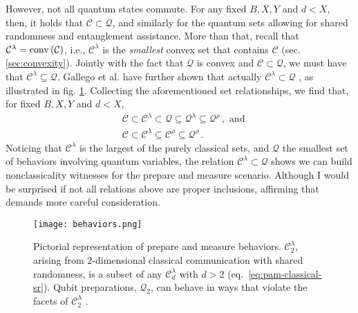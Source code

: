             However, not all quantum states commute. For any fixed $B,X,Y$ and $d < X$, then, it holds that $\mathcal{C} \subset \mathcal{Q}$, and similarly for the quantum sets allowing for shared randomness and entanglement assistance. More than that, recall that $\mathcal{C}^\lambda = \text{conv} \left( \mathcal{C} \right)$, i.e., $\mathcal{C}^\lambda$ is the \emph{smallest} convex set that contains $\mathcal{C}$ (sec. \ref{sec:convexity}). Jointly with the fact that $\mathcal{Q}$ is convex and $\mathcal{C} \subset \mathcal{Q}$, we must have that $\mathcal{C}^\lambda \subseteq \mathcal{Q}$. Gallego et al. have further shown that actually $\mathcal{C}^\lambda \subset \mathcal{Q}$ \cite{gallego_pam_2010}, as illustrated in fig. \ref{fig:pam-behaviors}. Collecting the aforementioned set relationships, we find that, for fixed $B, X, Y$ and $d < X$, 
			\begin{subequations}
            \begin{align}
                &\mathcal{C} \subset \mathcal{C}^\lambda \subset \mathcal{Q} \subseteq \mathcal{Q}^\lambda \subseteq \mathcal{Q}^\rho\, , \text{ and} \\
                &\mathcal{C} \subset \mathcal{C}^\lambda \subseteq \mathcal{C}^\rho \subseteq \mathcal{Q}^\rho\, .
            \end{align}
			\end{subequations}
            Noticing that $\mathcal{C}^\lambda$ is the largest of the purely classical sets, and $\mathcal{Q}$ the smallest set of behaviors involving quantum variables, the relation $\mathcal{C}^\lambda \subset \mathcal{Q}$ shows we can build nonclassicality witnesses for the prepare and measure scenario. Although I would be surprised if not all relations above are proper inclusions, affirming that demands more careful consideration.

			\begin{figure}
				\begin{minipage}[c]{0.43\textwidth}
					\centering
	                \texttt{[image: behaviors.png]}
			 	\end{minipage}
				\begin{minipage}[c]{0.55\textwidth}
					\caption{Pictorial representation of prepare and measure behaviors. $\mathcal{C}_2^\lambda$, arising from $2$-dimensional classical communication with shared randomness, is a subset of any $\mathcal{C}_d^\lambda$ with $d > 2$ (eq.~\ref{eq:pam-classical-sr}). Qubit preparations, $\mathcal{Q}_2$, can behave in ways that violate the facets of $\mathcal{C}_2^\lambda$ \cite{gallego_pam_2010}.}	
            		\label{fig:pam-behaviors}
			    \end{minipage}
			\end{figure}
			            
